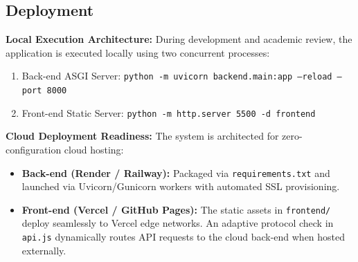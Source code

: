 \subsection{Deployment}
\textbf{Local Execution Architecture:} During development and academic review, the application is executed locally using two concurrent processes:
\begin{enumerate}
  \item Back-end ASGI Server: \texttt{python -m uvicorn backend.main:app --reload --port 8000}
  \item Front-end Static Server: \texttt{python -m http.server 5500 -d frontend}
\end{enumerate}

\textbf{Cloud Deployment Readiness:} The system is architected for zero-configuration cloud hosting:
\begin{itemize}
  \item \textbf{Back-end (Render / Railway):} Packaged via \texttt{requirements.txt} and launched via Uvicorn/Gunicorn workers with automated SSL provisioning.
  \item \textbf{Front-end (Vercel / GitHub Pages):} The static assets in \texttt{frontend/} deploy seamlessly to Vercel edge networks. An adaptive protocol check in \texttt{api.js} dynamically routes API requests to the cloud back-end when hosted externally.
\end{itemize}
